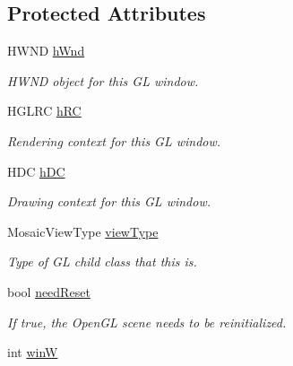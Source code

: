 \subsection*{Protected Attributes}
\begin{DoxyCompactItemize}
\item 
\hypertarget{class_mosaic_base_a039a0f469a7ac331c39319a0cc5c3ba1}{
HWND \hyperlink{class_mosaic_base_a039a0f469a7ac331c39319a0cc5c3ba1}{hWnd}}
\label{class_mosaic_base_a039a0f469a7ac331c39319a0cc5c3ba1}

\begin{DoxyCompactList}\small\item\em HWND object for this GL window. \end{DoxyCompactList}\item 
\hypertarget{class_mosaic_base_a44379a31e7295cc167deabf110ac4f46}{
HGLRC \hyperlink{class_mosaic_base_a44379a31e7295cc167deabf110ac4f46}{hRC}}
\label{class_mosaic_base_a44379a31e7295cc167deabf110ac4f46}

\begin{DoxyCompactList}\small\item\em Rendering context for this GL window. \end{DoxyCompactList}\item 
\hypertarget{class_mosaic_base_a872bcf01eb3dee6b04d3f22bba0e00bd}{
HDC \hyperlink{class_mosaic_base_a872bcf01eb3dee6b04d3f22bba0e00bd}{hDC}}
\label{class_mosaic_base_a872bcf01eb3dee6b04d3f22bba0e00bd}

\begin{DoxyCompactList}\small\item\em Drawing context for this GL window. \end{DoxyCompactList}\item 
\hypertarget{class_mosaic_base_aa6e80aa5db2862a16d5f400bc3e45d35}{
MosaicViewType \hyperlink{class_mosaic_base_aa6e80aa5db2862a16d5f400bc3e45d35}{viewType}}
\label{class_mosaic_base_aa6e80aa5db2862a16d5f400bc3e45d35}

\begin{DoxyCompactList}\small\item\em Type of GL child class that this is. \end{DoxyCompactList}\item 
\hypertarget{class_mosaic_base_a6db0fc2785ef22f57ae21a2435e486ff}{
bool \hyperlink{class_mosaic_base_a6db0fc2785ef22f57ae21a2435e486ff}{needReset}}
\label{class_mosaic_base_a6db0fc2785ef22f57ae21a2435e486ff}

\begin{DoxyCompactList}\small\item\em If true, the OpenGL scene needs to be reinitialized. \end{DoxyCompactList}\item 
\hypertarget{class_mosaic_base_aa3b3c5cae203cb6484ff3a94b8bae577}{
int \hyperlink{class_mosaic_base_aa3b3c5cae203cb6484ff3a94b8bae577}{winW}}
\label{class_mosaic_base_aa3b3c5cae203cb6484ff3a94b8bae577}


\end{DoxyCompactItemize}
